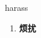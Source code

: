 
\begin{frame}
{\huge harass}
\begin{center}
\begin{enumerate}\Large
  \item \textbf{烦扰}
\end{enumerate}
\end{center}
\end{frame}
